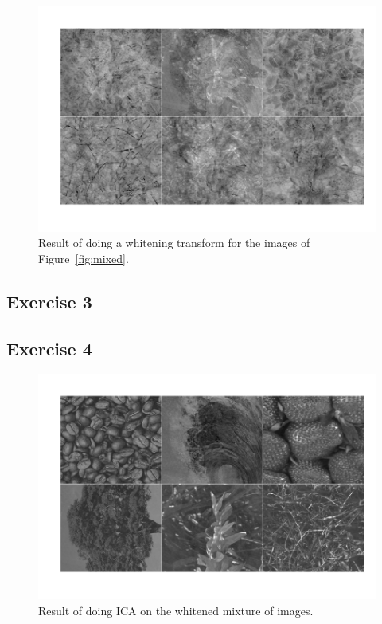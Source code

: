 \documentclass{article}
\begin{document}
\begin{figure}\centering
	\includegraphics[scale=\iscale]{white}
	\caption{Result of doing a whitening transform for the images of Figure~\ref{fig:mixed}.}\label{fig:white}
\end{figure}

\subsection{Exercise 3}
\subsection{Exercise 4}

\begin{figure}\centering
	\includegraphics[scale=\iscale]{icares}
	\caption{Result of doing ICA on the whitened mixture of images.}\label{fig:icares}
\end{figure}
\end{document}
